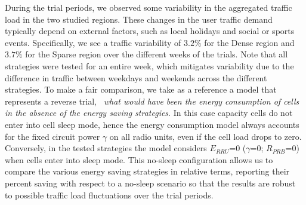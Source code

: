 During the trial periods, we observed some variability in the aggregated traffic load in the two studied regions. These changes in the user traffic demand typically depend on external factors, such as local holidays and social or sports events. Specifically, we see a traffic variability of $3.2\%$ for the Dense region and $3.7\%$ for the Sparse region over the different weeks of the trials. Note that all strategies were tested for an entire week, which mitigates variability due to the difference in traffic between weekdays and weekends across the different strategies. To make a fair comparison, we take as a reference a model that represents a reverse trial, \ie~\textit{what would have been the energy consumption of cells in the absence of the energy saving strategies}. In this case capacity cells do not enter into cell sleep mode, hence the energy consumption model always accounts for the fixed circuit power $\gamma$ on all radio units, even if the cell load drops to zero. Conversely, in the tested strategies the model considers $E_{RRU}$=$0$ (\ie $\gamma$=$0$; $R_{PRB}$=$0$) when cells enter into sleep mode. This no-sleep configuration allows us to compare the various energy saving strategies in relative terms, reporting their percent saving with respect to a no-sleep scenario so that the results are robust to possible traffic load fluctuations over the trial periods.

